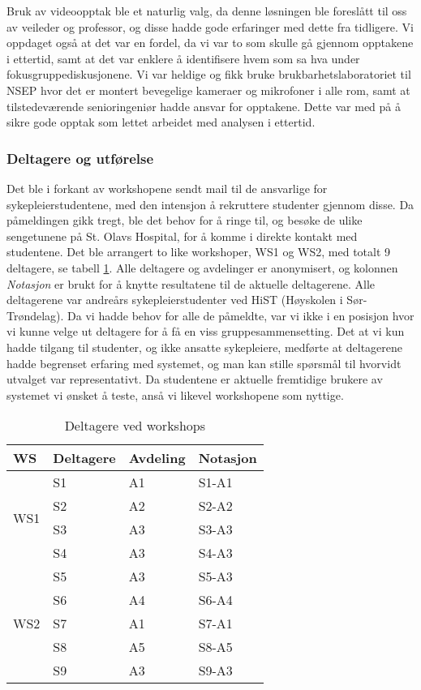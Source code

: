 \noindent
Bruk av videoopptak ble et naturlig valg, da denne løsningen ble foreslått til oss av veileder og professor, og disse hadde gode erfaringer med dette fra tidligere. Vi oppdaget også at det var en fordel, da vi var to som skulle gå gjennom opptakene i ettertid, samt at det var enklere å identifisere hvem som sa hva under fokusgruppediskusjonene. 
Vi var heldige og fikk bruke brukbarhetslaboratoriet til NSEP hvor det er montert bevegelige kameraer og mikrofoner i alle rom, samt at tilstedeværende senioringeniør hadde ansvar for opptakene. Dette var med på å sikre gode opptak som lettet arbeidet med analysen i ettertid.

\subsubsection{Deltagere og utførelse}
\label{deltagere}
Det ble i forkant av workshopene sendt mail til de ansvarlige for sykepleierstudentene, med den intensjon å rekruttere studenter gjennom disse. Da påmeldingen gikk tregt, ble det behov for å ringe til, og besøke de ulike sengetunene på St. Olavs Hospital, for å komme i direkte kontakt med studentene. 
Det ble arrangert to like workshoper, WS1 og WS2, med totalt 9 deltagere, se tabell \ref{Deltagere_WS}. Alle deltagere og avdelinger er anonymisert, og kolonnen \emph{Notasjon} er brukt for å knytte resultatene til de aktuelle deltagerene. Alle deltagerene var andreårs sykepleierstudenter ved HiST (Høyskolen i Sør-Trøndelag). Da vi hadde behov for alle de påmeldte, var vi ikke i en posisjon hvor vi kunne velge ut deltagere for å få en viss gruppesammensetting. Det at vi kun hadde tilgang til studenter, og ikke ansatte sykepleiere, medførte at deltagerene hadde begrenset erfaring med systemet, og man kan stille spørsmål til hvorvidt utvalget var representativt. Da studentene er aktuelle fremtidige brukere av systemet vi ønsket å teste, anså vi likevel workshopene som nyttige.

\begin{table}[H]
\centering
\begin{tabular}{ |l|l|l|l| }
\hline
WS & Deltagere & Avdeling & Notasjon \\ \hline
\multirow{4}{*}{WS1} & S1 & A1 & S1-A1 \\
 & S2 & A2 & S2-A2 \\
 & S3 & A3 & S3-A3 \\
 & S4 & A3 & S4-A3 \\ \hline
\multirow{5}{*}{WS2} & S5 & A3 & S5-A3 \\
 & S6 & A4 & S6-A4 \\
 & S7 & A1 & S7-A1 \\
 & S8 & A5 & S8-A5 \\
 & S9 & A3 & S9-A3 \\ 
\hline
\end{tabular}
\label{Deltagere_WS}
\caption{Deltagere ved workshops}
\end{table}

